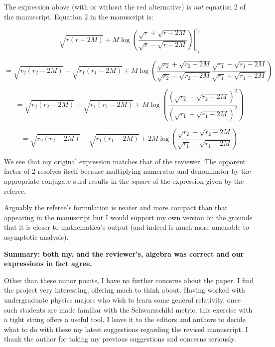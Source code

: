 \documentclass[12pt]{article}
\begin{document}
{\color{blue} The expression above (with or without the red
  alternative) is {\em not} equation 2 of the manuscript. Equation 2
  in the manuscript is:

  \[
  \left.
  \sqrt{r(r-2M)} +M\log\left(
  \frac{\sqrt{r}+\sqrt{r-2M}}{\sqrt{r}-\sqrt{r-2M}}\right)
  \right|_{r_1}^{r_2}
  \]

  \[
  = 
  \sqrt{r_2(r_2-2M)}-  \sqrt{r_1(r_1-2M)}
  +M\log\left(
  \frac{\sqrt{r_2}+\sqrt{r_2-2M}}{\sqrt{r_2}-\sqrt{r_2-2M}}
  \frac{\sqrt{r_1}-\sqrt{r_1-2M}}{\sqrt{r_1}+\sqrt{r_1-2M}}
  \right)
  \]
  
  \[
  = 
  \sqrt{r_2(r_2-2M)}-  \sqrt{r_1(r_1-2M)}
  +M\log\left(
  \frac{
    \left(\sqrt{r_2}+\sqrt{r_2-2M}\right)^2
  }{
    \left(\sqrt{r_1}+\sqrt{r_1-2M}\right)^2
  }
  \right)
  \]

  \[
  = 
  \sqrt{r_2(r_2-2M)}-  \sqrt{r_1(r_1-2M)}
  +2M\log\left(
  \frac{\sqrt{r_2}+\sqrt{r_2-2M}}{\sqrt{r_1}+\sqrt{r_1-2M}}
  \right)
  \]
  
  
We see that my original expression matches that of the reviewer.  The
apparent factor of 2 resolves itself because multiplying numerator and
denominator by the appropriate conjugate surd results in the {\em
  square} of the expression given by the referee.

Arguably the referee's formulation is neater and more compact than
that appearing in the manuscript but I would support my own version on
the grounds that it is closer to mathematica's output (and indeed is
much more amenable to asymptotic analysis).

{\bf Summary: both my, and the reviewer's, algebra was correct and our
  expressions in fact agree.}  }

Other than these minor points, I have no further concerns about the
paper. I find the project very interesting, offering much to think
about. Having worked with undergraduate physics majors who wish to
learn some general relativity, once such students are made familiar
with the Schwarzschild metric, this exercise with a tight string
offers a useful tool. I leave it to the editors and authors to decide
what to do with these my latest suggestions regarding the revised
manuscript. I thank the author for taking my previous suggestions and
concerns seriously.
\end{document}
